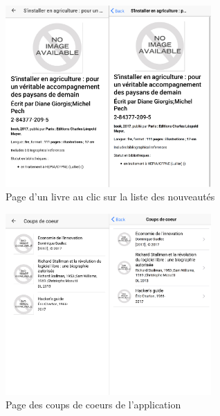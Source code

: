 \documentclass[a4paper, 12pt]{article}
\begin{document}
\begin{figure}
    \begin{center}
        \includegraphics[width=0.7\textwidth]{images/screenshots/android_iphone_3.png}
    \end{center}
    \caption{Page d'un livre au clic sur la liste des nouveautés}
\end{figure}
\begin{figure}
    \begin{center}
        \includegraphics[width=0.7\textwidth]{images/screenshots/android_iphone_4.png}
    \end{center}
    \caption{Page des coups de coeurs de l'application}
\end{figure}
\end{document}
